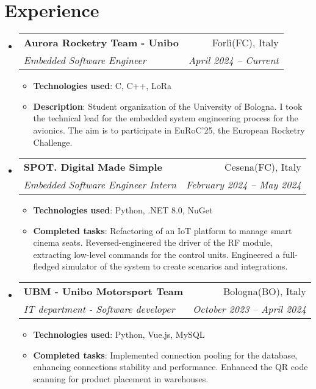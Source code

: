 \documentclass[letterpaper,11pt]{article}
\makeatletter
\newcommand{\resumeItem}[2]{
  \item\small{
    \textbf{#1}{: #2 \vspace{-2pt}}
  }
}
\newcommand{\resumeSubheading}[4]{
  \vspace{-1pt}\item
    \begin{tabular*}{0.97\textwidth}{l@{\extracolsep{\fill}}r}
      \textbf{#1} & #2 \\
      \textit{\small#3} & \textit{\small #4} \\
    \end{tabular*}\vspace{-5pt}
}
\newcommand{\resumeSubHeadingListStart}{\begin{itemize}[leftmargin=*]}
\newcommand{\resumeSubHeadingListEnd}{\end{itemize}}
\newcommand{\resumeItemListStart}{\begin{itemize}}
\newcommand{\resumeItemListEnd}{\end{itemize}\vspace{-5pt}}
\makeatother
\begin{document}
\section{Experience}
\resumeSubHeadingListStart
    \resumeSubheading{Aurora Rocketry Team - Unibo}{Forlì(FC), Italy}{Embedded Software Engineer}{April 2024 -- Current}
    \resumeItemListStart
        \resumeItem{Technologies used} {C, C++, LoRa}
        \resumeItem{Description}
        {Student organization of the University of Bologna.
	        I took the technical lead for the embedded system engineering process for the avionics.
	        The aim is to participate in EuRoC'25, the European Rocketry Challenge.}
    \resumeItemListEnd
    \resumeSubheading{SPOT. Digital Made Simple }{Cesena(FC), Italy}{Embedded Software Engineer Intern}{February 2024 -- May 2024}
    \resumeItemListStart
        \resumeItem{Technologies used} {Python, .NET 8.0, NuGet}
        \resumeItem{Completed tasks}
        {Refactoring of an IoT platform to manage smart cinema seats.
          Reversed-engineered the driver of the RF module, extracting low-level commands for the control units.
          Engineered a full-fledged simulator of the system to create scenarios and integrations.}
    \resumeItemListEnd
    \resumeSubheading{UBM - Unibo Motorsport Team}{Bologna(BO), Italy}{IT department - Software developer}{October 2023 -- April 2024}
    \resumeItemListStart
        \resumeItem{Technologies used} {Python, Vue.js, MySQL}
        \resumeItem{Completed tasks}
        {Implemented connection pooling for the database, enhancing connections stability and performance. Enhanced the QR code scanning for product placement in warehouses.}
    \resumeItemListEnd
\resumeSubHeadingListEnd

\begin{comment}    
    \resumeSubheading
      {UBM - Unibo Motorsport Team}{Bologna, Italy}
      {Software developer}{Oct. 2023 - Current}
      \resumeItemListStart
        \resumeItem{Python}
          {I improved the back-end of the application, implementing new features, 
            documenting the code and fixing bugs.
            In particular:}
            \resumeItemListStart
                \resumeItem{Connection pooling}
                    {I implemented a connection pool to the database, to avoid the overhead of creating a new connection every time a request is made.}
            \resumeItemListEnd
      \resumeItemListEnd

  
    \resumeSubheading
      {Other Company}{Location}
      {Position}{From - To}
      \resumeItemListStart
        \resumeItem{Technology you worked with/on}
          {Description}
        \resumeItem{Other technology you worked with/on}
          {Description}
      \resumeItemListEnd

    \resumeSubheading
      {Research Position}{Location}
      {Position}{From - To}
      \resumeItemListStart
        \resumeItem{Technology you worked with/on}
          {Description}
        \resumeItem{Other technology you worked with/on}
          {Description}
      \resumeItemListEnd
\end{comment}
\end{document}
